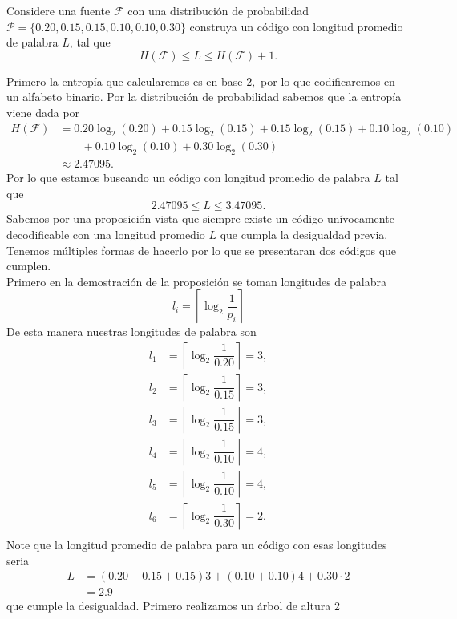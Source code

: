 
Considere una fuente $\mathcal{F}$ con una distribución  de probabilidad $\mathcal{P}=\{0.20,0.15,0.15,0.10,0.10,0.30\}$ construya un código con longitud promedio de palabra $L$, tal que
$$H(\mathcal{F})\leq L \leq H(\mathcal{F})+1.$$
\begin{sols}
 Primero la entropía que calcularemos es en base $2,$ por lo que codificaremos en un alfabeto binario. Por la distribución de probabilidad sabemos que la entropía viene dada por  
 \begin{align*}
  H(\mathcal{F})&=0.20\log_2(0.20)+0.15\log_2(0.15)+0.15\log_2(0.15)+0.10\log_2(0.10)\\
  &\phantom{++}+0.10\log_2(0.10)+0.30\log_2(0.30)\\
  &\approx 2.47095.
  \end{align*} 
  Por lo que estamos buscando un código con longitud promedio de palabra $L$ tal que
  $$2.47095\leq L\leq 3.47095.$$
  Sabemos por una proposición vista que siempre existe un código unívocamente decodificable con una longitud promedio $L$ que cumpla la desigualdad previa. Tenemos múltiples formas de hacerlo por lo que se presentaran dos códigos que cumplen.\\

  Primero en la demostración de la proposición se toman longitudes de palabra
  $$l_i=\left\lceil\log_2\dfrac{1}{p_i}\right\rceil$$
  De esta manera nuestras longitudes de palabra son
  \begin{align*}
        l_1&=\left\lceil\log_2\dfrac{1}{0.20}\right\rceil=3,\\
        l_2&=\left\lceil\log_2\dfrac{1}{0.15}\right\rceil=3,\\
        l_3&=\left\lceil\log_2\dfrac{1}{0.15}\right\rceil=3,\\
        l_4&=\left\lceil\log_2\dfrac{1}{0.10}\right\rceil=4,\\
        l_5&=\left\lceil\log_2\dfrac{1}{0.10}\right\rceil=4,\\
        l_6&=\left\lceil\log_2\dfrac{1}{0.30}\right\rceil=2.\\
  \end{align*}
  Note que la longitud promedio de palabra para un código con esas longitudes seria
  \begin{align*}
      L&=(0.20+0.15+0.15)3+(0.10+0.10)4+0.30\cdot 2\\
      &=2.9
  \end{align*}
  que cumple la desigualdad. Primero realizamos un árbol de altura 2
  \begin{center}
       \begin{tikzpicture}[level 1/.style={sibling distance=25mm}, level 2/.style={sibling distance=15mm}]


\end{tikzpicture}
\end{center}
\end{sols}
